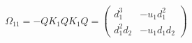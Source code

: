 \begin{equation}
\Omega_{11}= -Q K_1 Q K_1 Q = \left( \begin{array}{cc}
d_1^3  & -u_1d_1^2 \\
d_1^2 d_2 & -u_1 d_1 d_2
\end{array} \right)
\end{equation}

